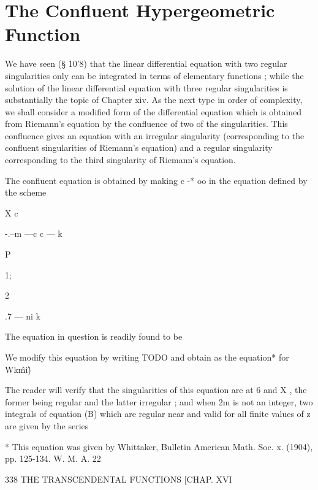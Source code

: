 \chapter{The Confluent Hypergeometric Function}


We have seen (§ 10'8) that the linear differential equation with two
regular singularities only can be integrated in terms of elementary
functions ; while the solution of the linear differential equation
with three regular singularities is substantially the topic of Chapter
xiv. As the next type in order of complexity, we shall consider a
modified form of the differential equation which is obtained from
Riemann's equation by the confluence of two of the singularities. This
confluence gives an equation with an irregular singularity
(corresponding to the confluent singularities of Riemann's equation)
and a regular singularity corresponding to the third singularity of
Riemann's equation.

The confluent equation is obtained by making c -* oo in the equation
defined by the scheme

X c

-.--m —c c — k



P



1;



2

.7 — ni k



The equation in question is readily found to be

We modify this equation by writing TODO and obtain as the equation*
for Wk\^mi\^)



The reader will verify that the singularities of this equation are at
6 and X , the former being regular and the latter irregular ; and when
2m is not an integer, two integrals of equation (B) which are regular
near and valid for all finite values of z are given by the series



* This equation was given by Whittaker, Bulletin American Math. Soc.
x. (1904), pp. 125-134. W. M. A. 22



338 THE TRANSCENDENTAL FUNCTIONS [CHAP. XVI



